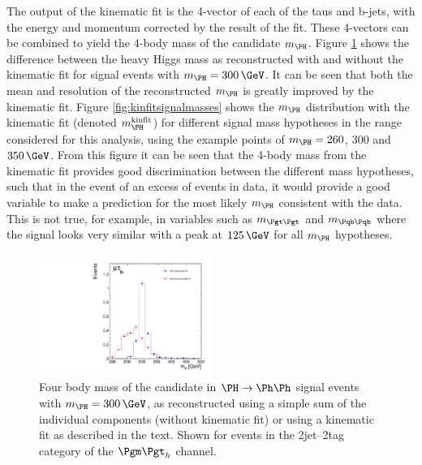 The output of the kinematic fit is the 4-vector of each of the taus and b-jets,
with the energy and momentum corrected by the result of the fit. These 4-vectors
can be combined to yield the 4-body mass of the candidate $m_{\PH}$. Figure
\ref{fig:kinfitvsmttbb}
shows the difference between the heavy Higgs mass as reconstructed with and
without the kinematic fit for signal events with $m_{\PH}=300\,\GeV$. It can
be seen that both the mean and resolution of the reconstructed $m_{\PH}$ 
is greatly improved by the kinematic fit. Figure \ref{fig:kinfitsignalmasses} shows the
$m_{\PH}$ distribution with the kinematic fit (denoted $m_{\PH}^{\text{kinfit}}$) 
for different signal mass hypotheses in the range
considered for this analysis, using the example points of $m_{\PH}=260$, $300$ 
and $350\,\GeV$. From this figure it can be seen that the 4-body mass from the kinematic fit provides
good discrimination between the different mass hypotheses, such that in the
event of an excess of events in data, it would provide a good variable to make a prediction for
the most likely $m_{\PH}$ consistent with the data. This is not true, for example, 
in variables such as $m_{\Pgt\Pgt}$ and $m_{\Pqb\Pqb}$ where the signal looks very 
similar with a peak at $125\,\GeV$ for all $m_{\PH}$ hypotheses.

\begin{figure}
\begin{center}
    \includegraphics[width=0.5\textwidth]
      {plots/Hhh/m_H_kinfit_vs_mttbb_2jet2tagSFMassCuts_mt_ggHTohh300.pdf}

\end{center}
\caption[Four body mass of the candidate \PH in $\PH\to\Ph\Ph$ signal events with
$m_{\PH}=300\,\GeV$, reconstructed with or without a kinematic fit.]{
Four body mass of the candidate \PH in $\PH\to\Ph\Ph$ signal events with
$m_{\PH}=300\,\GeV$, as reconstructed using a simple sum of the
individual components (without kinematic fit) or using a kinematic fit as
described in the text. Shown for events in the 2jet--2tag category of the
$\mutau$ channel.}
\label{fig:kinfitvsmttbb}
\end{figure} 


